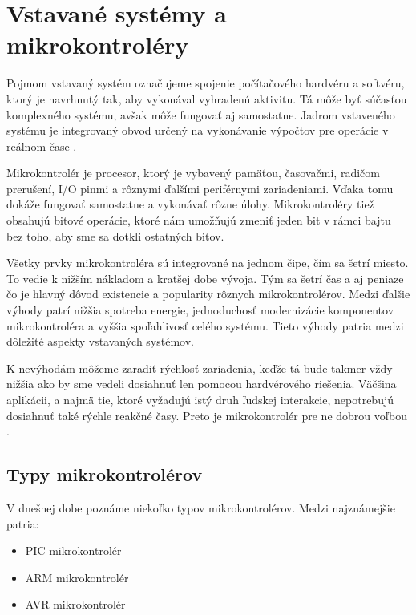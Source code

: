 \section{Vstavané systémy a mikrokontroléry}
\noindent \par
Pojmom vstavaný systém označujeme spojenie počítačového hardvéru a softvéru, ktorý je navrhnutý tak, aby vykonával vyhradenú aktivitu. Tá môže byť súčasťou komplexného systému, avšak môže fungovať aj samostatne. Jadrom vstaveného systému
je integrovaný obvod určený na vykonávanie výpočtov pre operácie v reálnom čase \cite{WhatEmbeddedSystem}. \par
Mikrokontrolér je procesor, ktorý je vybavený pamäťou, časovačmi, radičom prerušení, I/O pinmi a rôznymi ďalšími periférnymi
zariadeniami. Vďaka tomu dokáže fungovať samostatne a vykonávať rôzne úlohy. Mikrokontroléry tiež obsahujú bitové operácie, ktoré nám umožňujú zmeniť jeden bit v rámci bajtu bez toho, aby sme sa dotkli ostatných bitov. \par
Všetky prvky mikrokontroléra sú integrované na jednom čipe, čím sa šetrí miesto.
To vedie k nižším nákladom a kratšej dobe vývoja. Tým sa šetrí čas a aj peniaze čo je hlavný
dôvod existencie a popularity rôznych mikrokontrolérov. Medzi ďalšie výhody patrí nižšia spotreba energie,
jednoduchosť modernizácie komponentov mikrokontroléra a vyššia spoľahlivosť
celého systému. Tieto výhody patria medzi dôležité aspekty vstavaných systémov. \par
K nevýhodám môžeme zaradiť rýchlosť zariadenia, keďže tá bude takmer vždy
nižšia ako by sme vedeli dosiahnuť len pomocou hardvérového riešenia. Väčšina aplikácii, a najmä tie, ktoré vyžadujú istý druh ľudskej interakcie, nepotrebujú
dosiahnuť také rýchle reakčné časy. Preto je mikrokontrolér pre ne dobrou voľbou
\cite{guntherIntroductionMicrocontrollers2007}.

\subsection{Typy mikrokontrolérov}
\noindent \par
V dnešnej dobe poznáme niekoľko typov mikrokontrolérov. Medzi najznámejšie patria:
\begin{itemize}
    \item PIC mikrokontrolér
    \item ARM mikrokontrolér
    \item AVR mikrokontrolér
\end{itemize}

